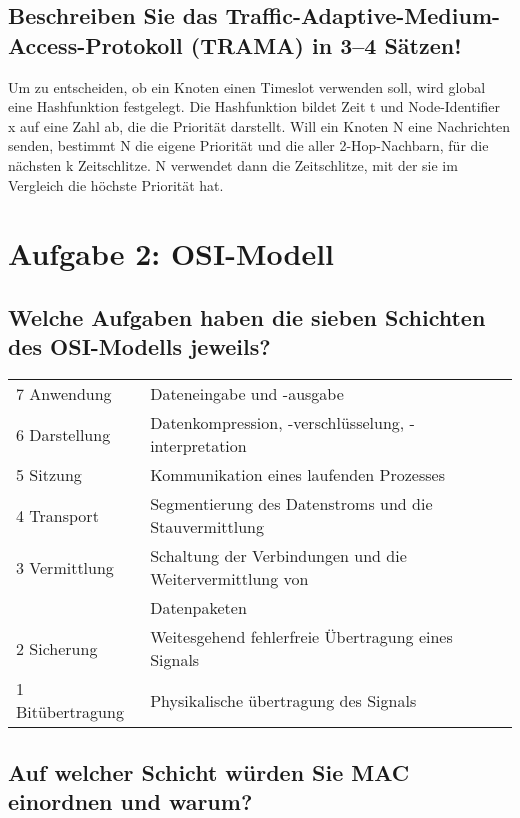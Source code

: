 \documentclass[11pt]{scrartcl}
\begin{document}
\subsection{Beschreiben Sie das Traffic-Adaptive-Medium-Access-Protokoll (TRAMA) in 3–4 Sätzen!}

Um zu entscheiden, ob ein Knoten einen Timeslot verwenden soll, wird global eine Hashfunktion festgelegt.
Die Hashfunktion bildet Zeit t und Node-Identifier x auf eine Zahl ab, die die Priorität darstellt.
Will ein Knoten N eine Nachrichten senden, bestimmt N die eigene Priorität und die aller 2-Hop-Nachbarn, für die nächsten k Zeitschlitze.
N verwendet dann die Zeitschlitze, mit der sie im Vergleich die höchste Priorität hat.

\section{Aufgabe 2: OSI-Modell}

\subsection{Welche Aufgaben haben die sieben Schichten des OSI-Modells jeweils?}

\begin{tabular}{ l l  }
  7 Anwendung & Dateneingabe und -ausgabe \\
  6 Darstellung & Datenkompression, -verschlüsselung, -interpretation \\
  5 Sitzung & Kommunikation eines laufenden Prozesses  \\
  4 Transport & Segmentierung des Datenstroms und die Stauvermittlung  \\
  3 Vermittlung & Schaltung der Verbindungen und die Weitervermittlung von \\ & Datenpaketen  \\
  2 Sicherung & Weitesgehend fehlerfreie Übertragung eines Signals  \\
  1 Bitübertragung & Physikalische übertragung des Signals  \\
\end{tabular}


\subsection{Auf welcher Schicht würden Sie MAC einordnen und warum?}
\end{document}
